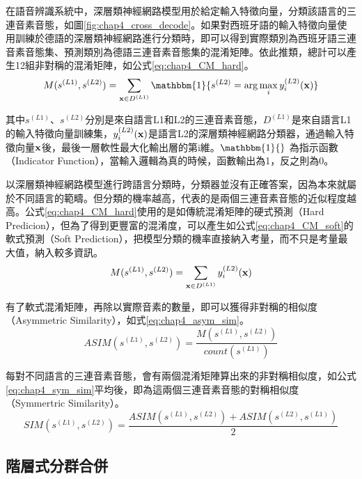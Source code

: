 在語音辨識系統中，深層類神經網路模型用於給定輸入特徵向量，分類該語言的三連音素音態，如圖\ref{fig:chap4_cross_decode}。如果對西班牙語的輸入特徵向量使用訓練於德語的深層類神經網路進行分類時，即可以得到實際類別為西班牙語三連音素音態集、預測類別為德語三連音素音態集的混淆矩陣。依此推類，總計可以產生12組非對稱的混淆矩陣，如公式\ref{eq:chap4_CM_hard}。
\begin{equation} \label{eq:chap4_CM_hard}
M( s^{(L1)} , s^{(L2)} ) = \sum_{ \bold{x} \in D^{(L1)} } \mathbbm{1} \{ s^{(L2)} = \arg\max_{i} y_{i}^{(L2)}(\bold{x}) \}
\end{equation}

其中$s^{(L1)}$、$s^{(L2)}$分別是來自語言L1和L2的三連音素音態，$D^{(L1)}$是來自語言L1的輸入特徵向量訓練集，$y_{i}^{(L2)}(\bold{x})$是語言L2的深層類神經網路分類器，通過輸入特徵向量$\bold{x}$後，最後一層軟性最大化輸出層的第i維。$\mathbbm{1}\{ \}$ 為指示函數（Indicator Function），當輸入邏輯為真的時候，函數輸出為1，反之則為0。

以深層類神經網路模型進行跨語言分類時，分類器並沒有正確答案，因為本來就屬於不同語言的範疇。但分類的機率越高，代表的是兩個三連音素音態的近似程度越高。公式\ref{eq:chap4_CM_hard}使用的是如傳統混淆矩陣的硬式預測（Hard Predicion），但為了得到更豐富的混淆度，可以產生如公式\ref{eq:chap4_CM_soft}的軟式預測（Soft Prediction），把模型分類的機率直接納入考量，而不只是考量最大值，納入較多資訊。
\begin{equation} \label{eq:chap4_CM_soft}
M( s^{(L1)} , s^{(L2)} ) = \sum_{ \bold{x} \in D^{(L1)} } y_{i}^{(L2)}(\bold{x}) 
\end{equation}

有了軟式混淆矩陣，再除以實際音素的數量，即可以獲得非對稱的相似度（Asymmetric Similarity），如式\ref{eq:chap4_asym_sim}。
\begin{equation} \label{eq:chap4_asym_sim}
ASIM( s^{(L1)} , s^{(L2)} ) =  \frac{ M( s^{(L1)} , s^{(L2)}) } { count( s^{(L1)} )}
\end{equation}

每對不同語言的三連音素音態，會有兩個混淆矩陣算出來的非對稱相似度，如公式\ref{eq:chap4_sym_sim}平均後，即為這兩個三連音素音態的對稱相似度（Symmertric Similarity）。
\begin{equation} \label{eq:chap4_sym_sim}
SIM( s^{(L1)} , s^{(L2)} ) =  \frac{ ASIM( s^{(L1)} , s^{(L2)})  + ASIM( s^{(L2)} , s^{(L1)})} {2 }
\end{equation}
\subsection{階層式分群合併}


